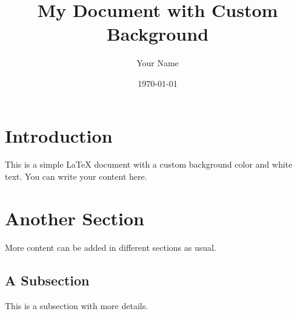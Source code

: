 \documentclass{article}
\begin{document}
\title{My Document with Custom Background}
\author{Your Name}
\date{\today}

\maketitle

\section{Introduction}
This is a simple LaTeX document with a custom background color and white text.
You can write your content here.

\section{Another Section}
More content can be added in different sections as usual.

\subsection{A Subsection}
This is a subsection with more details.
\end{document}
